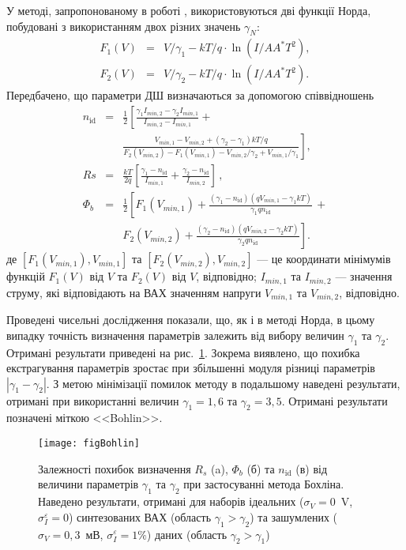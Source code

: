 У методі, запропонованому в роботі \cite{Bohlin}, використовуються дві функції Норда, побудовані з використанням двох різних значень $\gamma_N$:
\begin{eqnarray}
\label{eqBohlin}
F_1(V)&=&V/\gamma_1-kT/q\cdot\ln(I/AA^*T^2),
\nonumber\\
F_2(V)&=&V/\gamma_2-kT/q\cdot\ln(I/AA^*T^2).
\end{eqnarray}
Передбачено, що параметри ДШ визначаються за допомогою співвідношень
\begin{eqnarray}
\label{eqBohlinDet}
n_\mathrm{id}&=&\frac{1}{2}\left[\frac{\gamma_1I_{min,2}-\gamma_2I_{min,1}}{I_{min,2}-I_{min,1}}+\right.
\\
&&\left.\frac{V_{min,1}-V_{min,2}+(\gamma_2-\gamma_1)kT/q}{F_2(V_{min,2})-F_1(V_{min,1})-V_{min,2}/\gamma_2+V_{min,1}/\gamma_1}\right]
,\nonumber
\\
Rs&=&\frac{kT}{2q}\left[\frac{\gamma_1-n_\mathrm{id}}{I_{min,1}}+\frac{\gamma_2-n_\mathrm{id}}{I_{min,2}}\right]\,,
\\
\Phi_b&=&\frac{1}{2}\left[F_1(V_{min,1})+\frac{(\gamma_1-n_\mathrm{id})(qV_{min,1}-\gamma_1kT)}{\gamma_1qn_\mathrm{id}}\,+\right.
\nonumber\\
&&\left.F_2(V_{min,2})+\frac{(\gamma_2-n_\mathrm{id})(qV_{min,2}-\gamma_2kT)}{\gamma_2qn_\mathrm{id}}\right].
\end{eqnarray}
де
$[F_1(V_{min,1}), V_{min,1}]$ та $[F_2(V_{min,2}), V_{min,2}]$ --- це координати мінімумів функцій  $F_1(V)$ від $V$ та $F_2(V)$ від $V$, відповідно;
$I_{min,1}$ та $I_{min,2}$ --- значення струму, які відповідають на ВАХ значенням напруги $V_{min,1}$ та $V_{min,2}$, відповідно.

Проведені чисельні дослідження показали, що, як і в методі Норда, в цьому випадку точність визначення параметрів залежить від вибору величин $\gamma_1$ та $\gamma_2$.
Отримані результати приведені на рис.~\ref{figBohlin}.
Зокрема виявлено, що похибка екстрагування параметрів зростає при збільшенні модуля різниці параметрів $|\gamma_1-\gamma_2|$.
З метою мінімізації помилок методу в подальшому наведені результати, отримані при використанні величин $\gamma_1=1,6$ та $\gamma_2=3,5$.
Отримані результати позначені міткою <<Bohlin>>.

\begin{figure}
\center
\texttt{[image: figBohlin]}%
\caption{\label{figBohlin}
Залежності похибок визначення $R_s$ (a), $\Phi_b$ (б) та $n_\mathrm{id}$ (в) від величини параметрів $\gamma_1$ та $\gamma_2$ при застосуванні метода Бохліна.
Наведено результати, отримані для наборів ідеальних ($\sigma_V=0$~V, $\sigma_I^\varepsilon=0$) синтезованих ВАХ (область $\gamma_1>\gamma_2$) та зашумлених ($\sigma_V=0,3$~мВ, $\sigma_I^\varepsilon=1\%$) даних (область $\gamma_2>\gamma_1$)
}
\end{figure}

